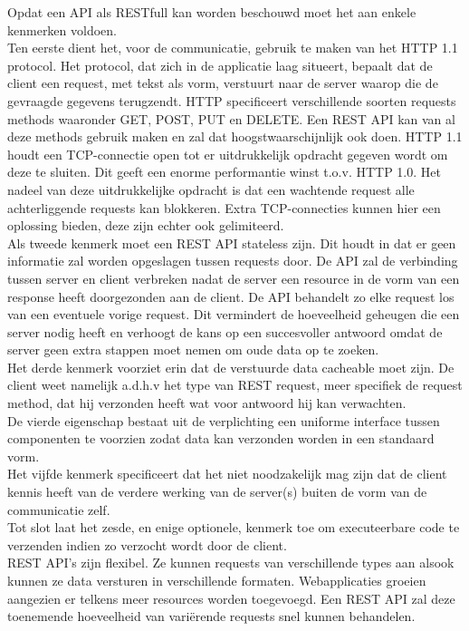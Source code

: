 Opdat een API als RESTfull kan worden beschouwd moet het aan enkele kenmerken voldoen.\\
Ten eerste dient het, voor de communicatie, gebruik te maken van het HTTP 1.1 protocol. Het protocol, dat zich in de applicatie laag situeert,
bepaalt dat de client een request, met tekst als vorm, verstuurt naar de server waarop die de gevraagde gegevens terugzendt.
HTTP specificeert verschillende soorten requests methods waaronder GET, POST, PUT en DELETE. Een REST API kan van al deze methods gebruik maken en zal dat
hoogstwaarschijnlijk ook doen. HTTP 1.1 houdt een TCP-connectie open tot er uitdrukkelijk opdracht gegeven wordt om deze te sluiten.
Dit geeft een enorme performantie winst t.o.v. HTTP 1.0. Het nadeel van deze uitdrukkelijke opdracht is dat een wachtende request alle achterliggende requests kan blokkeren.
Extra TCP-connecties kunnen hier een oplossing bieden, deze zijn echter ook gelimiteerd.
~\autocite{w3Protocol}\\
Als tweede kenmerk moet een REST API stateless zijn. Dit houdt in dat er geen informatie zal worden opgeslagen tussen requests door.
De API zal de verbinding tussen server en client verbreken nadat de server een resource in de vorm van een response heeft doorgezonden aan de client.
De API behandelt zo elke request los van een eventuele vorige request. Dit vermindert de hoeveelheid geheugen die een server nodig heeft en verhoogt de
kans op een succesvoller antwoord omdat de server geen extra stappen moet nemen om oude data op te zoeken.\\
Het derde kenmerk voorziet erin dat de verstuurde data cacheable moet zijn. De client weet namelijk a.d.h.v het type van REST request,
meer specifiek de request method, dat hij verzonden heeft wat voor antwoord hij kan verwachten.\\
De vierde eigenschap bestaat uit de verplichting een uniforme interface tussen componenten te voorzien zodat data kan verzonden worden in een standaard vorm.\\
Het vijfde kenmerk specificeert dat het niet noodzakelijk mag zijn dat de client kennis heeft van de verdere werking van de server(s) buiten de vorm van de communicatie zelf.\\
Tot slot laat het zesde, en enige optionele, kenmerk toe om executeerbare code te verzenden indien zo verzocht wordt door de client.
~\autocite{redhat}\\

REST API's zijn flexibel. Ze kunnen requests van verschillende types aan alsook kunnen ze data versturen in verschillende formaten.
Webapplicaties groeien aangezien er telkens meer resources worden toegevoegd. Een REST API zal deze toenemende hoeveelheid van vari\"erende requests snel kunnen behandelen.\\

